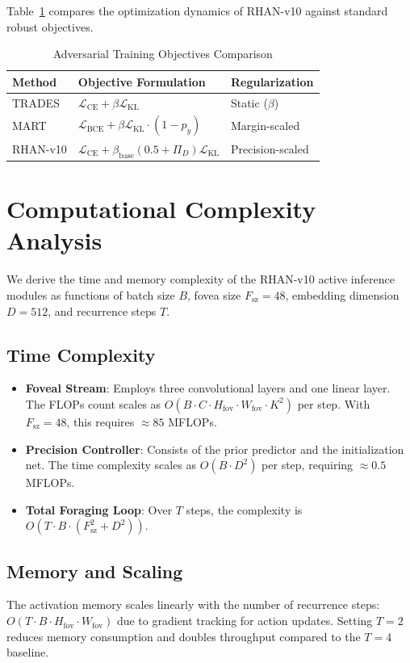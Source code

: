 Table~\ref{tab:method_comparison} compares the optimization dynamics of RHAN-v10 against standard robust objectives.

\begin{table}[!ht]
\centering
\caption{Adversarial Training Objectives Comparison}
\label{tab:method_comparison}
\begin{tabular}{lll}
\toprule
\textbf{Method} & \textbf{Objective Formulation} & \textbf{Regularization} \\
\midrule
TRADES & $\mathcal{L}_{\text{CE}} + \beta \mathcal{L}_{\text{KL}}$ & Static ($\beta$) \\
MART & $\mathcal{L}_{\text{BCE}} + \beta \mathcal{L}_{\text{KL}} \cdot (1-p_y)$ & Margin-scaled \\
RHAN-v10 & $\mathcal{L}_{\text{CE}} + \beta_{\text{base}} (0.5 + \Pi_D) \mathcal{L}_{\text{KL}}$ & Precision-scaled \\
\bottomrule
\end{tabular}
\end{table}

\section{Computational Complexity Analysis}
We derive the time and memory complexity of the RHAN-v10 active inference modules as functions of batch size $B$, fovea size $F_{\text{sz}} = 48$, embedding dimension $D = 512$, and recurrence steps $T$.

\subsection{Time Complexity}
\begin{itemize}
    \item \textbf{Foveal Stream}: Employs three convolutional layers and one linear layer. The FLOPs count scales as $O(B \cdot C \cdot H_{\text{fov}} \cdot W_{\text{fov}} \cdot K^2)$ per step. With $F_{\text{sz}} = 48$, this requires $\approx 85$ MFLOPs.
    \item \textbf{Precision Controller}: Consists of the prior predictor and the initialization net. The time complexity scales as $O(B \cdot D^2)$ per step, requiring $\approx 0.5$ MFLOPs.
    \item \textbf{Total Foraging Loop}: Over $T$ steps, the complexity is $O(T \cdot B \cdot (F_{\text{sz}}^2 + D^2))$.
\end{itemize}

\subsection{Memory and Scaling}
The activation memory scales linearly with the number of recurrence steps: $O(T \cdot B \cdot H_{\text{fov}} \cdot W_{\text{fov}})$ due to gradient tracking for action updates. Setting $T=2$ reduces memory consumption and doubles throughput compared to the $T=4$ baseline.

